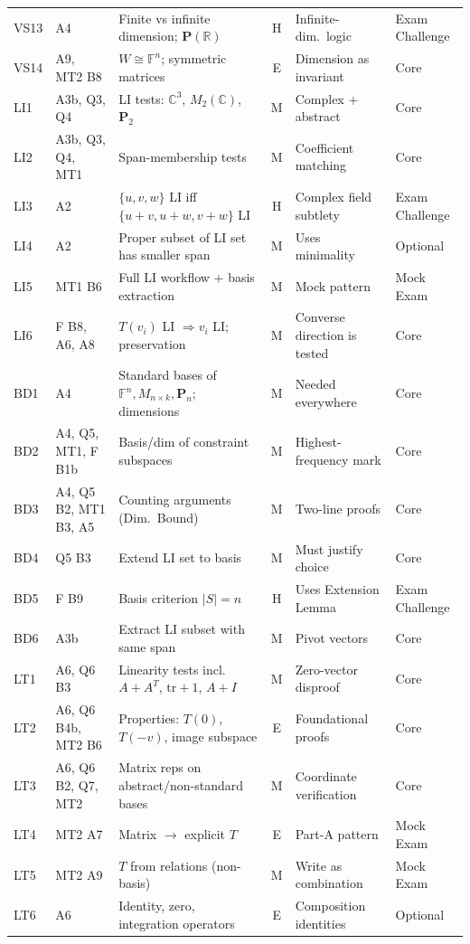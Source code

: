 \documentclass[9pt]{article}
\begin{document}
{\begin{longtable}{@{}l p{2.6cm} p{5.2cm} c p{3.9cm} p{1.7cm}@{}}
VS13 & A4 & Finite vs infinite dimension; $\mathbf P(\mathbb R)$ & H & Infinite-dim.\ logic & Exam Challenge\\
VS14 & A9, MT2 B8 & $W\cong\mathbb F^n$; symmetric matrices & E & Dimension as invariant & Core\\
LI1 & A3b, Q3, Q4 & LI tests: $\mathbb C^3$, $M_2(\mathbb C)$, $\mathbf P_2$ & M & Complex $+$ abstract & Core\\
LI2 & A3b, Q3, Q4, MT1 & Span-membership tests & M & Coefficient matching & Core\\
LI3 & A2 & $\{u,v,w\}$ LI iff $\{u{+}v,u{+}w,v{+}w\}$ LI & H & Complex field subtlety & Exam Challenge\\
LI4 & A2 & Proper subset of LI set has smaller span & M & Uses minimality & Optional\\
LI5 & MT1 B6 & Full LI workflow + basis extraction & M & Mock pattern & Mock Exam\\
LI6 & F B8, A6, A8 & $T(v_i)$ LI $\Rightarrow v_i$ LI; preservation & M & Converse direction is tested & Core\\
BD1 & A4 & Standard bases of $\mathbb F^n,M_{n\times k},\mathbf P_n$; dimensions & M & Needed everywhere & Core\\
BD2 & A4, Q5, MT1, F B1b & Basis/dim of constraint subspaces & M & Highest-frequency mark & Core\\
BD3 & A4, Q5 B2, MT1 B3, A5 & Counting arguments (Dim.\ Bound) & M & Two-line proofs & Core\\
BD4 & Q5 B3 & Extend LI set to basis & M & Must justify choice & Core\\
BD5 & F B9 & Basis criterion $\lvert S\rvert=n$ & H & Uses Extension Lemma & Exam Challenge\\
BD6 & A3b & Extract LI subset with same span & M & Pivot vectors & Core\\
LT1 & A6, Q6 B3 & Linearity tests incl.\ $A{+}A^T$, $\mathrm{tr}{+}1$, $A{+}I$ & M & Zero-vector disproof & Core\\
LT2 & A6, Q6 B4b, MT2 B6 & Properties: $T(0)$, $T(-v)$, image subspace & E & Foundational proofs & Core\\
LT3 & A6, Q6 B2, Q7, MT2 & Matrix reps on abstract/non-standard bases & M & Coordinate verification & Core\\
LT4 & MT2 A7 & Matrix $\to$ explicit $T$ & E & Part-A pattern & Mock Exam\\
LT5 & MT2 A9 & $T$ from relations (non-basis) & M & Write as combination & Mock Exam\\
LT6 & A6 & Identity, zero, integration operators & E & Composition identities & Optional\\

\end{longtable}}
\end{document}
